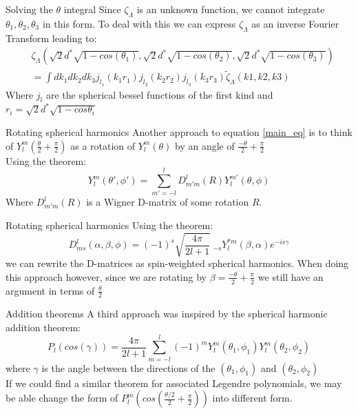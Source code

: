 \documentclass{beamer}
\begin{document}
    \begin{frame}{Solving the $\theta$ integral}
        Since $\zeta_{\Lambda}$ is an unknown function, we cannot integrate $\theta_1, \theta_2, \theta_3$ in this form.
        To deal with this we can express $\zeta_{\Lambda}$ as an inverse Fourier Transform leading to:
        \begin{align*}
            &\zeta_{\Lambda}(\sqrt{2}d^*\sqrt{1-cos(\theta_1)}, \sqrt{2}d^*\sqrt{1-cos(\theta_2)}, \sqrt{2}d^*\sqrt{1-cos(\theta_3)})\\
            &= \int dk_1 dk_2 dk_3 j_{l_1}(k_1r_1) j_{l_2}(k_2r_2) j_{l_3}(k_3r_3) \tilde \zeta_{\Lambda}(k1, k2, k3)
        \end{align*}
        Where $j_l$ are the spherical bessel functions of the first kind and $r_i = \sqrt{2}d^*\sqrt{1-cos \theta_i}$
    \end{frame}

    \begin{frame}{Rotating spherical harmonics}
        Another approach to equation \ref{main_eq} is to think of $Y_l^m(\frac{\theta}{2} + \frac{\pi}{2})$ as a rotation of $Y_l^m(\theta)$ by an angle of $\frac{-\theta}{2} + \frac{\pi}{2}$\\
        Using the theorem:
        \begin{equation*}
            Y_l^m(\theta', \phi') = \sum_{m'=-l}^l D_{m'm}^l(R) Y_l^{m'}(\theta, \phi)
        \end{equation*}
        Where $D_{m'm}^l(R)$ is a Wigner D-matrix of some rotation $R$.
    \end{frame}

    \begin{frame}{Rotating spherical harmonics}
        Using the theorem:
        \begin{equation*}
            D_{ms}^l(\alpha, \beta, \phi) = (-1)^s \sqrt{\frac{4\pi}{2l + 1}} \ _{-s}Y_l^{*m}(\beta, \alpha)e^{-is\gamma}
        \end{equation*}
        we can rewrite the D-matrices as spin-weighted spherical harmonics. When doing this approach however, since we are rotating by $\beta = \frac{-\theta}{2} + \frac{\pi}{2}$
        we still have an argument in terms of $\frac{\theta}{2}$
    \end{frame}

    \begin{frame}{Addition theorems}
        A third approach was inspired by the spherical harmonic addition theorem:
        \begin{equation*}
            P_l(cos(\gamma)) = \frac{4\pi}{2l+1}\sum_{m=-l}^l (-1)^m Y_l^m(\theta_1, \phi_1) Y_l^m(\theta_2, \phi_2)
        \end{equation*}
        where $\gamma$ is the angle between the directions of the $(\theta_1, \phi_1)$ and $(\theta_2, \phi_2)$\\
        If we could find a similar theorem for associated Legendre polynomials, we may be able change the form of $P_l^m(cos(\frac{\theta/2}{2} + \frac{\pi}{2}))$
        into different form.
    \end{frame}
\end{document}
